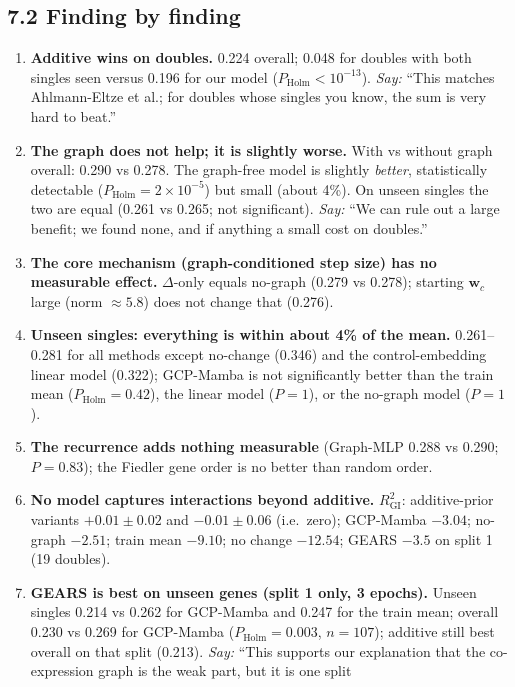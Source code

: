 \documentclass[10.5pt]{article}
\begin{document}
\subsection*{7.2 Finding by finding}
\begin{enumerate}[label=\textbf{F\arabic*.},leftmargin=2em]
\item \textbf{Additive wins on doubles.} 0.224 overall; 0.048 for doubles with both singles seen versus 0.196
for our model ($P_{\mathrm{Holm}}<10^{-13}$).
\emph{Say:} ``This matches Ahlmann-Eltze et al.; for doubles whose singles you know, the sum is very hard to beat.''
\item \textbf{The graph does not help; it is slightly worse.} With vs without graph overall: 0.290 vs 0.278.
The graph-free model is slightly \emph{better}, statistically detectable
($P_{\mathrm{Holm}}=2\times10^{-5}$) but small (about 4\%). On unseen singles the two are equal (0.261 vs
0.265; not significant).
\emph{Say:} ``We can rule out a large benefit; we found none, and if anything a small cost on doubles.''
\item \textbf{The core mechanism (graph-conditioned step size) has no measurable effect.} $\Delta$-only equals
no-graph (0.279 vs 0.278); starting $\mathbf{w}_c$ large (norm $\approx5.8$) does not change that (0.276).
\item \textbf{Unseen singles: everything is within about 4\% of the mean.} 0.261--0.281 for all
methods except no-change (0.346) and the control-embedding linear model (0.322); GCP-Mamba is not significantly better than the train mean ($P_{\mathrm{Holm}}=0.42$),
the linear model ($P=1$), or the no-graph model ($P=1$).
\item \textbf{The recurrence adds nothing measurable} (Graph-MLP 0.288 vs 0.290; $P=0.83$); the Fiedler gene
order is no better than random order.
\item \textbf{No model captures interactions beyond additive.} $R^2_{\mathrm{GI}}$: additive-prior variants
$+0.01\pm0.02$ and $-0.01\pm0.06$ (i.e.\ zero); GCP-Mamba $-3.04$; no-graph $-2.51$; train mean $-9.10$;
no change $-12.54$; GEARS $-3.5$ on split 1 (19 doubles).
\item \textbf{GEARS is best on unseen genes (split 1 only, 3 epochs).} Unseen singles 0.214 vs 0.262 for
GCP-Mamba and 0.247 for the train mean; overall 0.230 vs 0.269 for GCP-Mamba ($P_{\mathrm{Holm}}=0.003$,
$n=107$); additive still best overall on that split (0.213).
\emph{Say:} ``This supports our explanation that the co-expression graph is the weak part, but it is one split

\end{enumerate}
\end{document}
